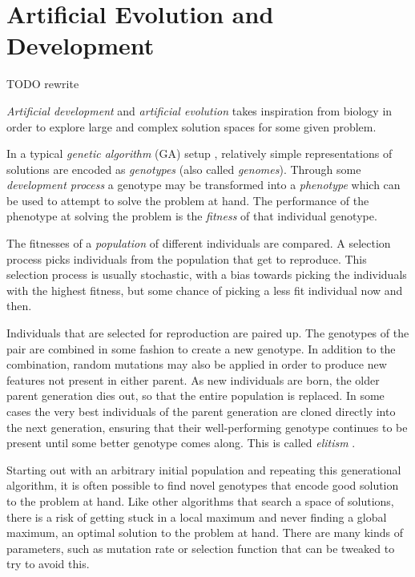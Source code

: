 \section{Artificial Evolution and Development}
TODO rewrite

\textit{Artificial development} and \textit{artificial evolution} takes inspiration from biology in order to explore large and complex solution spaces for some given problem.

In a typical \textit{genetic algorithm} (GA) setup \cite{mitchell-2001},
relatively simple representations of solutions are encoded as \textit{genotypes} (also called \textit{genomes}).
Through some \textit{development process} a genotype may be transformed into a \textit{phenotype} which can be used to attempt to solve the problem at hand.
The performance of the phenotype at solving the problem is the \textit{fitness} of that individual genotype.

The fitnesses of a \textit{population} of different individuals are compared.
A selection process picks individuals from the population that get to reproduce.
This selection process is usually stochastic, with a bias towards picking the individuals with the highest fitness, but some chance of picking a less fit individual now and then.

Individuals that are selected for reproduction are paired up.
The genotypes of the pair are combined in some fashion to create a new genotype.
In addition to the combination, random mutations may also be applied in order to produce new features not present in either parent.
As new individuals are born, the older parent generation dies out, so that the entire population is replaced.
In some cases the very best individuals of the parent generation are cloned directly into the next generation,
ensuring that their well-performing genotype continues to be present until some better genotype comes along.
This is called \textit{elitism} \cite{vasconcelos2001improvements}.

Starting out with an arbitrary initial population and repeating this generational algorithm,
it is often possible to find novel genotypes that encode good solution to the problem at hand.
Like other algorithms that search a space of solutions,
there is a risk of getting stuck in a local maximum and never finding a global maximum,
an optimal solution to the problem at hand.
There are many kinds of parameters, such as mutation rate or selection function that can be tweaked to try to avoid this.

